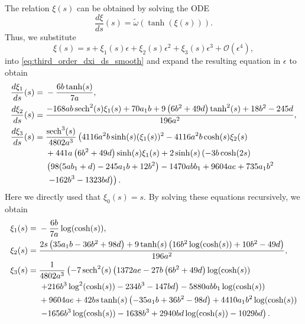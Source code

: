 The relation $\xi(s)$ can be obtained by solving the ODE
\begin{equation}
				\label{eq:third_order_dxi_ds_smooth}
				\frac{d\xi}{ds}(s) = \tilde \omega(\tanh(\xi(s))).
\end{equation}
Thus, we substitute 
\begin{equation*}
				\xi(s) = s + \xi_1(s)\epsilon + \xi_2(s)\epsilon^2
				+ \xi_3(s)\epsilon^3 + \mathcal{O}(\epsilon^4),
\end{equation*}
into \cref{eq:third_order_dxi_ds_smooth} and expand the resulting equation in
$\epsilon$ to obtain
\begin{align*}
\frac{d\xi_1}{ds}(s) ={}& -\frac{6b\tanh(s)}{7a}, \\
\frac{d\xi_2}{ds}(s) ={}& \frac{-168 a b \operatorname{sech}^2(s) \xi_1(s)+70 a_1 b+9 \left(6 b^2+49 d\right) \tanh ^2(s)+18 b^2-245 d}{196 a^2} , \\
\frac{d\xi_3}{ds}(s) ={}& \frac{\operatorname{sech}^3(s)}{4802 a^3} \left(4116 a^2 b \sinh (s) (\xi_1(s))^2-4116 a^2 b \cosh (s) \xi_2(s) \right. \\
                        & +441 a \left(6 b^2+49 d\right) \sinh (s)\xi_1(s)+2 \sinh (s) \left(-3 b \cosh (2 s) \right. \\
                        & \left(98 (5 a b_1+d)-245 a_1 b+12 b^2\right)-1470 a b b_1+9604 a e+735 a_1 b^2 \\
                        & \left. \left. -162 b^3-1323 b d\right)\right).
\end{align*}
Here we directly used that $\xi_0(s)=s$. By solving these equations recursively,
we obtain
\begin{equation*}
\begin{aligned}
\xi_1(s) ={}& - \frac{6b}{7a}\log(\cosh(s)), \\
\xi_2(s) ={}& \frac{2 s \left(35 a_1 b-36 b^2+98 d\right)+9 \tanh (s) \left(16 b^2 \log (\cosh (s))+10 b^2-49 d\right)}{196 a^2}, \\
\xi_3(s) ={}& \frac{1}{4802 a^3}\left(-7 \operatorname{sech}^2(s) \left(1372 a e-27 b \left(6 b^2+49 d\right) \log (\cosh (s)) \right. \right. \\
            & \left. +216 b^3 \log ^2(\cosh(s))-234 b^3-147 b d\right)-5880 a b b_1 \log (\cosh (s)) \\
            & + 9604 a e+42 b s \tanh (s) \left(-35 a_1 b+36 b^2-98 d\right)+4410 a_1 b^2 \log (\cosh (s)) \\
            & \left. -1656 b^3 \log (\cosh (s))-1638 b^3+2940 b d \log (\cosh (s))-1029 b d\right).
\end{aligned}
\end{equation*}
